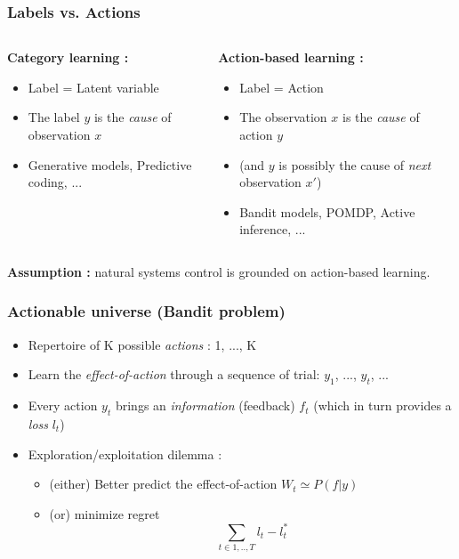 \documentclass{beamer}
\begin{document}
\begin{frame}\frametitle{Labels vs. Actions}
	\begin{columns}
		
		\begin{column}{.48 \linewidth}
			{\bf Category learning :}
			\begin{itemize}
			\item Label = Latent variable
			\item The label $y$ is the \emph{cause} of observation $x$ 
			\item Generative models, Predictive coding, ...
			\end{itemize}
		\end{column}

		\begin{column}{.48 \linewidth}
			{\bf Action-based learning :}
			\begin{itemize}
			\item Label = Action
			\item The observation $x$ is the \emph{cause} of action $y$
			\item (and $y$ is possibly the cause of \emph{next} observation $x'$)
			\item Bandit models, POMDP, Active inference, ...
			\end{itemize}
		\end{column}
	\end{columns}
\begin{exampleblock}{}
	{\bf Assumption :} natural systems control is grounded on action-based learning.
\end{exampleblock}
\end{frame}

\begin{frame}\frametitle{Actionable universe (Bandit problem)}
	\begin{itemize}
		\item Repertoire of K possible \emph{actions} : 1, ..., K
		\item Learn the \emph{effect-of-action} through a sequence of trial: $y_1$, ..., $y_t$, ...
		\item Every action $y_t$ brings an \textit{information} (feedback) $f_t$ 
		(which in turn provides a \textit{loss} $l_t$)
		\item Exploration/exploitation dilemma :
		\begin{itemize}
			\item (either) Better predict the effect-of-action $W_t \simeq P(f|y)$
			\item (or) minimize regret $$ \sum_{t \in 1,..,T} l_t - l^*_t$$ 
		\end{itemize}
	\end{itemize}
\end{frame}
\end{document}
